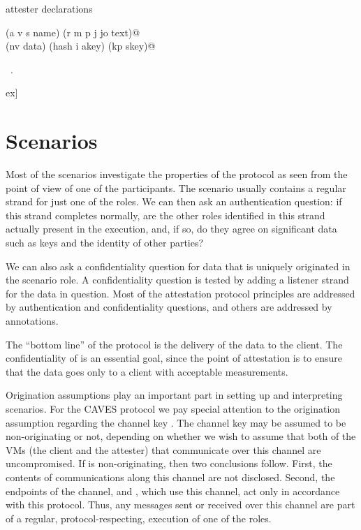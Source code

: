 \documentclass[titlepage,12pt]{article}
\theoremstyle{definition}
\begin{document}
\begin{flushleft} \small
\begin{minipage}{\linewidth} \label{scrap22}
attester declarations\nobreak\ {\footnotesize {}}
\vspace{-1ex}
\begin{list}{}{} \item
\mbox{}\verb@(a v s name) (r m p j jo text)@\\
\mbox{}\verb@(nv data) (hash i akey) (kp skey)@{\NWsep}
\end{list}
\vspace{-1ex}
\footnotesize\addtolength{\baselineskip}{-1ex}
\begin{list}{}{\setlength{\itemsep}{-\parsep}\setlength{\itemindent}{-\leftmargin}}
\item \NWtxtMacroRefIn\ .
\end{list}
\end{minipage}\4ex]
\end{flushleft}
\section{Scenarios}\label{sec:scenarios}

Most of the scenarios investigate the properties of the protocol
as seen from the point of view of one of the participants. The
scenario usually contains a regular strand for just one of the roles.
We can then ask an authentication question: if this strand
completes normally, are the other roles identified in this strand
actually present in the execution, and, if so, do they agree on
significant data such as keys and the identity of other parties?

We can also ask a confidentiality question for data that is uniquely
originated in the scenario role. A confidentiality question is tested
by adding a listener strand for the data in question.
Most of the attestation protocol principles are addressed by
authentication and confidentiality questions, and others are addressed
by annotations.

The ``bottom line'' of the protocol is the delivery of the data
 to the client. The confidentiality of  is an essential goal,
since the point of attestation is to ensure that the data goes only
to a client with acceptable measurements.

Origination assumptions play an important part in setting up and
interpreting scenarios.  For the CAVES protocol we pay special
attention to the origination assumption regarding the channel key
.  The channel key  may be assumed to be
non-originating or not, depending on whether we wish to assume that
both of the VMs (the client and the attester) that communicate over
this channel are uncompromised. If  is non-originating,
then two conclusions follow.  First, the contents of communications
along this channel are not disclosed.  Second, the endpoints of the
channel,  and , which use this channel, act only in accordance
with this protocol.  Thus, any messages sent or received over this
channel are part of a regular, protocol-respecting, execution of one
of the roles.
\end{document}
